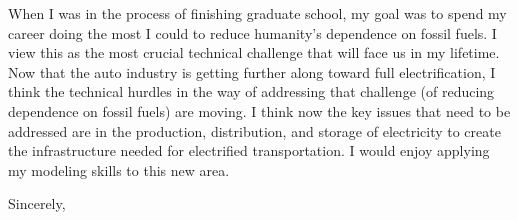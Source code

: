 \documentclass[11pt]{letter} %
\begin{document}
\begin{letter}{}
When I was in the process of finishing graduate school, my goal was to
spend my career doing the most I could to reduce humanity's dependence
on fossil fuels.  I view this as the most crucial technical challenge
that will face us in my lifetime.  Now that the auto industry is
getting further along toward full electrification, I think the
technical hurdles in the way of addressing that challenge (of reducing
dependence on fossil fuels) are moving.  I think now the key issues
that need to be addressed are in the production, distribution, and
storage of electricity to create the infrastructure needed for
electrified transportation.  I would enjoy applying my modeling skills
to this new area.

\closing{Sincerely,}




\end{letter}
\end{document}
